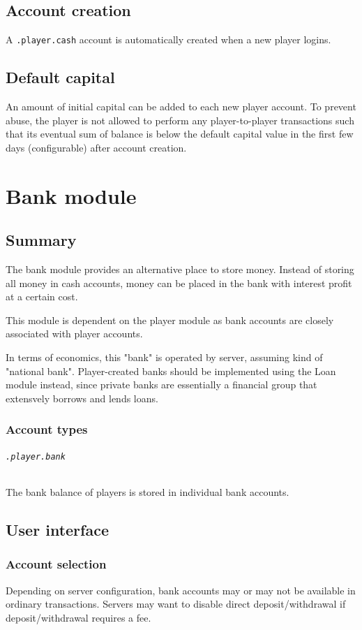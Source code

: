 \documentclass{report}
\begin{document}
		\chapter{Account creation}
			A \texttt{.player.cash} account is automatically created when a new player logins.

			\chapter{Default capital}
				An amount of initial capital can be added to each new player account.
				To prevent abuse, the player is not allowed to perform any player-to-player transactions
				such that its eventual sum of balance is below the default capital value
				in the first few days (configurable) after account creation.

	\part{Bank module}
		\chapter{Summary}
			The bank module provides an alternative place to store money.
			Instead of storing all money in cash accounts, money can be placed in the bank with interest profit at a certain cost.

			This module is dependent on the player module as bank accounts are closely associated with player accounts.

			In terms of economics, this "bank" is operated by server, assuming kind of "national bank".
			Player-created banks should be implemented using the Loan module instead,
			since private banks are essentially a financial group that extensvely borrows and lends loans.

			\section{Account types}
				\paragraph{\texttt{.player.bank}}
					The bank balance of players is stored in individual bank accounts.

		\chapter{User interface}
			\section{Account selection}
				Depending on server configuration, bank accounts may or may not be available in ordinary transactions.
				Servers may want to disable direct deposit/withdrawal if deposit/withdrawal requires a fee.
\end{document}
